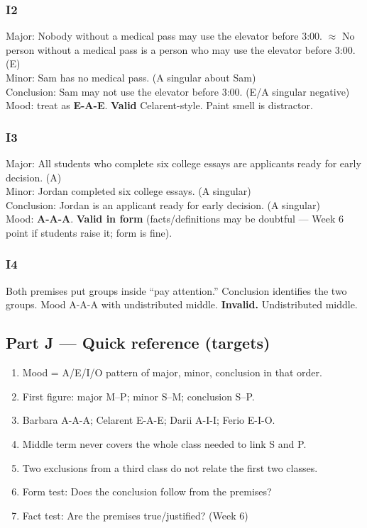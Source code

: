 \documentclass[11pt]{article}
\begin{document}
\subsubsection*{I2}
Major: Nobody without a medical pass may use the elevator before 3:00. $\approx$ No person without a medical pass is a person who may use the elevator before 3:00. (E)\\
Minor: Sam has no medical pass. (A singular about Sam)\\
Conclusion: Sam may not use the elevator before 3:00. (E/A singular negative)\\
Mood: treat as \textbf{E-A-E}. \textbf{Valid} Celarent-style. Paint smell is distractor.

\subsubsection*{I3}
Major: All students who complete six college essays are applicants ready for early decision. (A)\\
Minor: Jordan completed six college essays. (A singular)\\
Conclusion: Jordan is an applicant ready for early decision. (A singular)\\
Mood: \textbf{A-A-A}. \textbf{Valid in form} (facts/definitions may be doubtful --- Week 6 point if students raise it; form is fine).

\subsubsection*{I4}
Both premises put groups inside ``pay attention.'' Conclusion identifies the two groups. Mood A-A-A with undistributed middle. \textbf{Invalid.} Undistributed middle.

\subsection*{Part J --- Quick reference (targets)}
\begin{enumerate}
\item Mood = A/E/I/O pattern of major, minor, conclusion in that order.
\item First figure: major M--P; minor S--M; conclusion S--P.
\item Barbara A-A-A; Celarent E-A-E; Darii A-I-I; Ferio E-I-O.
\item Middle term never covers the whole class needed to link S and P.
\item Two exclusions from a third class do not relate the first two classes.
\item Form test: Does the conclusion follow from the premises?
\item Fact test: Are the premises true/justified? (Week 6)
\end{enumerate}
\end{document}
